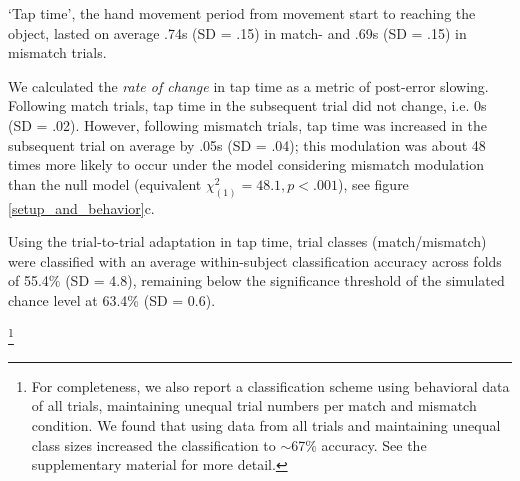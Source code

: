 `Tap time', the hand movement period from movement start to reaching the object, lasted on average .74s (SD = .15) in match- and .69s (SD = .15) in mismatch trials. 


We calculated the \textit{rate of change} in tap time as a metric of post-error slowing. Following match trials, tap time in the subsequent trial did not change, i.e. 0s (SD = .02). However, following mismatch trials, tap time was increased in the subsequent trial on average by .05s (SD = .04); this modulation was about 48 times more likely to occur under the model considering mismatch modulation than the null model (equivalent ${\chi}^2_{(1)} = 48.1, p<.001$), see figure \ref{setup_and_behavior}c. 


Using the trial-to-trial adaptation in tap time, trial classes (match/mismatch) were classified with an average within-subject classification accuracy across folds of 55.4\% (SD = 4.8), remaining below the significance threshold of the simulated chance level at 63.4\% (SD = 0.6).

\footnote{For completeness, we also report a classification scheme using behavioral data of all trials, maintaining unequal trial numbers per match and mismatch condition. We found that using data from all trials and maintaining unequal class sizes increased the classification to $\sim$67\% accuracy. See the supplementary material for more detail.}









